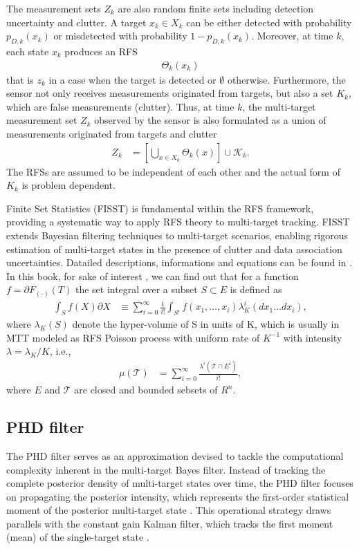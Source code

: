 The measurement sets $Z_k$ are also random finite sets including detection uncertainty and clutter. A target $x_k \in X_k$ can be either detected with probability $p_{D,k}(x_k)$ or misdetected with probability $1-p_{D,k}(x_k)$. Moreover, at time $k$, each state $x_k$ produces an RFS
\begin{align}
    \Theta_k(x_k)
\end{align}
that is ${z_k}$ in a case when the target is detected or $\emptyset$ otherwise. Furthermore, the sensor not only
receives measurements originated from targets, but also a set $K_k$, which are false measurements (clutter). Thus, at
time $k$, the multi-target measurement set $Z_k$ observed by the sensor is also formulated as a union of measurements
originated from targets and clutter
\begin{align}
    Z_k &= \left[ \bigcup_{x \in X_k} \Theta_k(x) \right] \cup \mathcal{K}_k. \label{eq:rfs_measurement_union}
\end{align}
The RFSs are assumed to be independent of each other and the actual form of $K_k$ is problem dependent.


Finite Set Statistics (FISST) is fundamental within the RFS framework, providing a systematic way to apply RFS theory
to multi-target tracking. FISST extends Bayesian filtering techniques to multi-target scenarios, enabling rigorous
estimation of multi-target states in the presence of clutter and data association uncertainties. Datailed
descriptions, informations and equations can be found in \cite{FISSTgoodman1997}. In this book, for sake of interest
, we can find out that for a function $f=\partial F_{(\cdot)}(T)$ the set integral over a subset $S \subset E$ is
defined as
\begin{align}
    \int_{S}f(X)\partial X &\equiv \sum_{i=0}^{\infty} \frac{1}{i!}\int_{S^i} f({x_1,\dots,x_i})\lambda_K^i(dx_1\dots dx_i),
\end{align}
where $\lambda_K(S)$ denote the hyper-volume of S in units of K, which is usually in MTT modeled as RFS Poisson process with uniform rate of $K^{-1}$ with intensity $\lambda = \lambda_K/K$, i.e., \cite{VoRFS2003}
\begin{align}
    \mu(\mathcal{T}) &= \sum_{i=0}^{\infty} \frac{\lambda^i(\mathcal{T} \cap E^i)}{i!},
\end{align}
where $E$ and $\mathcal{T}$ are closed and bounded sebsets of $R^n$.

        \subsection{PHD filter}
The PHD filter serves as an approximation devised to tackle the computational complexity inherent in the multi-target Bayes filter. Instead of tracking the complete posterior density of multi-target states over time, the PHD filter focuses on propagating the posterior intensity, which represents the first-order statistical moment of the posterior multi-target state \cite{mahler}. This operational strategy draws parallels with the constant gain Kalman filter, which tracks the first moment (mean) of the single-target state \cite{VoMaPHD2006}.

